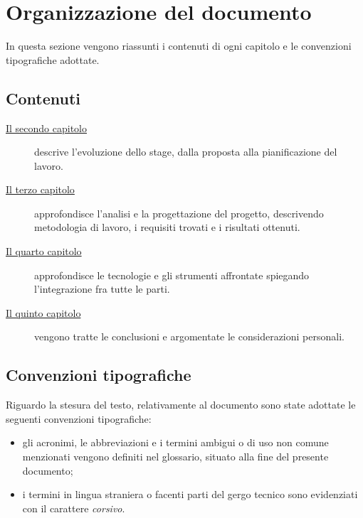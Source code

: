 \section{Organizzazione del documento}
In questa sezione vengono riassunti i contenuti di ogni capitolo e le convenzioni tipografiche adottate.
\subsection{Contenuti}
\begin{description}
	\item[{\hyperref[ch:evoluzione-dello-stage]{Il secondo capitolo}}] descrive l'evoluzione dello stage, dalla proposta alla pianificazione del lavoro.
	
	\item[{\hyperref[ch:analisi-e-progettazione]{Il terzo capitolo}}] approfondisce l'analisi e la progettazione del progetto, descrivendo metodologia di lavoro, i requisiti trovati e i risultati ottenuti.
	
	\item[{\hyperref[ch:sviluppo]{Il quarto capitolo}}] approfondisce le tecnologie e gli strumenti affrontate spiegando l'integrazione fra tutte le parti.
	
	\item[{\hyperref[ch:conlusione]{Il quinto capitolo}}] vengono tratte le conclusioni e argomentate le considerazioni personali.
\end{description}
\subsection{Convenzioni tipografiche}
Riguardo la stesura del testo, relativamente al documento sono state adottate le seguenti convenzioni tipografiche:
\begin{itemize}
	\item gli acronimi, le abbreviazioni e i termini ambigui o di uso non comune menzionati vengono definiti nel glossario, situato alla fine del presente documento;
	\item i termini in lingua straniera o facenti parti del gergo tecnico sono evidenziati con il carattere \emph{corsivo}.
\end{itemize}

